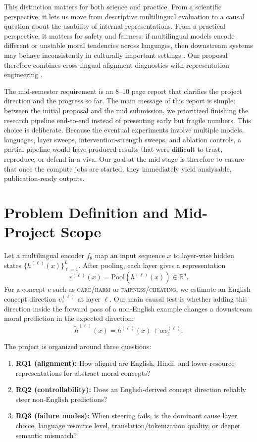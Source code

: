 \documentclass[11pt]{article}
\begin{document}
This distinction matters for both science and practice. From a scientific perspective, it lets us move from descriptive multilingual evaluation to a causal question about the usability of internal representations. From a practical perspective, it matters for safety and fairness: if multilingual models encode different or unstable moral tendencies across languages, then downstream systems may behave inconsistently in culturally important settings \citep{hammerl2023moralbias,agarwal2024ethical,khandelwal2024dit}. Our proposal therefore combines cross-lingual alignment diagnostics with representation engineering \citep{zou2023repe,turner2023actadd}.

The mid-semester requirement is an 8--10 page report that clarifies the project direction and the progress so far. The main message of this report is simple: between the initial proposal and the mid submission, we prioritized finishing the research pipeline end-to-end instead of presenting early but fragile numbers. This choice is deliberate. Because the eventual experiments involve multiple models, languages, layer sweeps, intervention-strength sweeps, and ablation controls, a partial pipeline would have produced results that were difficult to trust, reproduce, or defend in a viva. Our goal at the mid stage is therefore to ensure that once the compute jobs are started, they immediately yield analysable, publication-ready outputs.

\section{Problem Definition and Mid-Project Scope}
Let a multilingual encoder $f_{\theta}$ map an input sequence $x$ to layer-wise hidden states $\{h^{(\ell)}(x)\}_{\ell=1}^{L}$. After pooling, each layer gives a representation
\begin{equation}
    r^{(\ell)}(x) = \mathrm{Pool}(h^{(\ell)}(x)) \in \mathbb{R}^{d}.
\end{equation}
For a concept $c$ such as \textsc{care/harm} or \textsc{fairness/cheating}, we estimate an English concept direction $v_c^{(\ell)}$ at layer $\ell$. Our main causal test is whether adding this direction inside the forward pass of a non-English example changes a downstream moral prediction in the expected direction:
\begin{equation}
    \tilde{h}^{(\ell)}(x) = h^{(\ell)}(x) + \alpha v_c^{(\ell)}.
\end{equation}

The project is organized around three questions:
\begin{enumerate}[leftmargin=*,itemsep=2pt]
    \item \textbf{RQ1 (alignment):} How aligned are English, Hindi, and lower-resource representations for abstract moral concepts?
    \item \textbf{RQ2 (controllability):} Does an English-derived concept direction reliably steer non-English predictions?
    \item \textbf{RQ3 (failure modes):} When steering fails, is the dominant cause layer choice, language resource level, translation/tokenization quality, or deeper semantic mismatch?
\end{enumerate}
\end{document}
